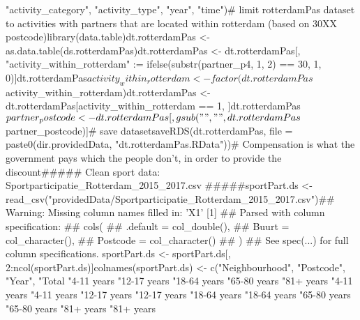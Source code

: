 \documentclass{article}\usepackage[]{graphicx}\usepackage[]{color}
\begin{document}
                               "activity_category", "activity_type", "year", "time")# limit rotterdamPas dataset to activities with partners that are located within rotterdam (based on 30XX postcode)library(data.table)dt.rotterdamPas <- as.data.table(ds.rotterdamPas)dt.rotterdamPas <- dt.rotterdamPas[, "activity_within_rotterdam" := ifelse(substr(partner_p4, 1, 2) == 30, 1, 0)]dt.rotterdamPas$activity_within_rotterdam <- factor(dt.rotterdamPas$activity_within_rotterdam)dt.rotterdamPas <- dt.rotterdamPas[activity_within_rotterdam == 1, ]dt.rotterdamPas$partner_postcode <- dt.rotterdamPas[, gsub(" ", "", dt.rotterdamPas$partner_postcode)]# save datasetsaveRDS(dt.rotterdamPas, file = paste0(dir.providedData, "dt.rotterdamPas.RData"))# Compensation is what the government pays which the people don't, in order to provide the discount##### Clean sport data: Sportparticipatie_Rotterdam_2015_2017.csv #####sportPart.ds <- read_csv("providedData/Sportparticipatie_Rotterdam_2015_2017.csv")## Warning: Missing column names filled in: 'X1' [1]
## Parsed with column specification:
## cols(
##   .default = col_double(),
##   Buurt = col_character(),
##   Postcode = col_character()
## )
## See spec(...) for full column specifications.
sportPart.ds <- sportPart.ds[, 2:ncol(sportPart.ds)]colnames(sportPart.ds) <- c("Neighbourhood",
                            "Postcode",
                            "Year",
                            "Total %
                            "4-11 years %
                            "12-17 years %
                            "18-64 years %
                            "65-80 years %
                            "81+ years %
                            "4-11 years %
                            "4-11 years %
                            "12-17 years %
                            "12-17 years %
                            "18-64 years %
                            "18-64 years %
                            "65-80 years %
                            "65-80 years %
                            "81+ years %
                            "81+ years %
\end{document}
